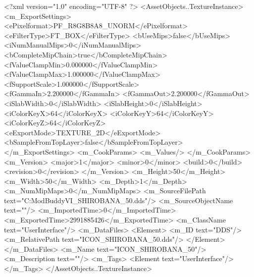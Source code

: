 <?xml version="1.0" encoding="UTF-8" ?>
<AssetObjects..TextureInstance>
	<m_ExportSettings>
		<ePixelformat>PF_R8G8B8A8_UNORM</ePixelformat>
		<eFilterType>FT_BOX</eFilterType>
		<bUseMips>false</bUseMips>
		<iNumManualMips>0</iNumManualMips>
		<bCompleteMipChain>true</bCompleteMipChain>
		<fValueClampMin>0.000000</fValueClampMin>
		<fValueClampMax>1.000000</fValueClampMax>
		<fSupportScale>1.000000</fSupportScale>
		<fGammaIn>2.200000</fGammaIn>
		<fGammaOut>2.200000</fGammaOut>
		<iSlabWidth>0</iSlabWidth>
		<iSlabHeight>0</iSlabHeight>
		<iColorKeyX>64</iColorKeyX>
		<iColorKeyY>64</iColorKeyY>
		<iColorKeyZ>64</iColorKeyZ>
		<eExportMode>TEXTURE_2D</eExportMode>
		<bSampleFromTopLayer>false</bSampleFromTopLayer>
	</m_ExportSettings>
	<m_CookParams>
		<m_Values/>
	</m_CookParams>
	<m_Version>
		<major>1</major>
		<minor>0</minor>
		<build>0</build>
		<revision>0</revision>
	</m_Version>
	<m_Height>50</m_Height>
	<m_Width>50</m_Width>
	<m_Depth>1</m_Depth>
	<m_NumMipMaps>0</m_NumMipMaps>
	<m_SourceFilePath text="C:\Users\asus\Documents\Firaxis ModBuddy\Civilization VI\temppic\ICON_SHIROBANA_50.dds"/>
	<m_SourceObjectName text=""/>
	<m_ImportedTime>0</m_ImportedTime>
	<m_ExportedTime>2991885426</m_ExportedTime>
	<m_ClassName text="UserInterface"/>
	<m_DataFiles>
		<Element>
			<m_ID text="DDS"/>
			<m_RelativePath text="ICON_SHIROBANA_50.dds"/>
		</Element>
	</m_DataFiles>
	<m_Name text="ICON_SHIROBANA_50"/>
	<m_Description text=""/>
	<m_Tags>
		<Element text="UserInterface"/>
	</m_Tags>
</AssetObjects..TextureInstance>

